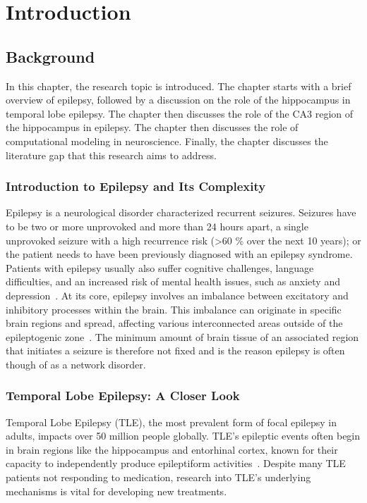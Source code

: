 \chapter{Introduction}


\section{Background}
In this chapter, the research topic is introduced. 
The chapter starts with a brief overview of epilepsy, followed by a discussion on the role of the hippocampus in temporal lobe epilepsy. 
The chapter then discusses the role of the CA3 region of the hippocampus in epilepsy. 
The chapter then discusses the role of computational modeling in neuroscience. 
Finally, the chapter discusses the literature gap that this research aims to address.

\subsection{Introduction to Epilepsy and Its Complexity}
Epilepsy is a neurological disorder characterized recurrent seizures. 
Seizures have to be two or more unprovoked and more than 24 hours apart, a single unprovoked
seizure with a high recurrence risk (>60 \% over the next 10 years); or the patient needs to have been previously diagnosed with an epilepsy syndrome.
Patients with epilepsy usually also suffer cognitive challenges, language difficulties, and an increased risk of mental health issues, 
such as anxiety and depression~\parencite{fisherILAEOfficialReport2014}. At its core, epilepsy 
involves an imbalance between excitatory and inhibitory processes within the brain. 
This imbalance can originate in specific brain regions and spread, affecting various interconnected areas 
outside of the epileptogenic zone~\parencite{ludersEpileptogenicZoneGeneral2006}.
The minimum amount of brain tissue of an associated region that initiates a seizure is therefore not fixed and is the 
reason epilepsy is often though of as a network disorder.

\subsection{Temporal Lobe Epilepsy: A Closer Look}
Temporal Lobe Epilepsy (TLE), the most prevalent form of focal epilepsy in adults, 
impacts over 50 million people globally. TLE's epileptic events often begin in 
brain regions like the hippocampus and entorhinal cortex, known for their 
capacity to independently produce epileptiform activities~\parencite{lyttonComputerSimulationEpilepsy2005}.
Despite many TLE patients not responding to medication, research into TLE's 
underlying mechanisms is vital for developing new treatments.

